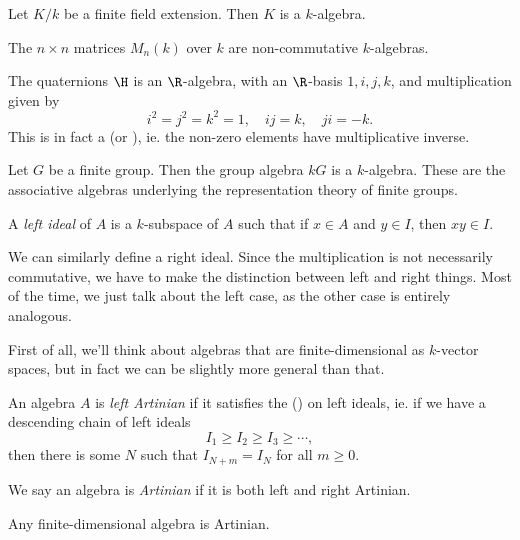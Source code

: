 \documentclass[a4paper]{article}
\begin{document}
\begin{eg}
  Let $K/k$ be a finite field extension. Then $K$ is a $k$-algebra.
\end{eg}

\begin{eg}
  The $n\times n$ matrices $M_n(k)$ over $k$ are non-commutative $k$-algebras.
\end{eg}

\begin{eg}
  The quaternions $\H$ is an $\R$-algebra, with an $\R$-basis $1, i, j, k$, and multiplication given by
  \[
    i^2 = j^2 = k^2 = 1,\quad ij = k,\quad ji = -k.
  \]
  This is in fact a  (or ), ie. the non-zero elements have multiplicative inverse.
\end{eg}

\begin{eg}
  Let $G$ be a finite group. Then the group algebra $kG$ is a $k$-algebra. These are the associative algebras underlying the representation theory of finite groups.
\end{eg}

\begin{defi}[Ideal]
  A \emph{left ideal} of $A$ is a $k$-subspace of $A$ such that if $x \in A$ and $y \in I$, then $xy \in I$.
\end{defi}
We can similarly define a right ideal. Since the multiplication is not necessarily commutative, we have to make the distinction between left and right things. Most of the time, we just talk about the left case, as the other case is entirely analogous.

First of all, we'll think about algebras that are finite-dimensional as $k$-vector spaces, but in fact we can be slightly more general than that.
\begin{defi}
  An algebra $A$ is \emph{left Artinian} if it satisfies the  () on left ideals, ie. if we have a descending chain of left ideals
  \[
    I_1 \geq I_2 \geq I_3 \geq \cdots,
  \]
  then there is some $N$ such that $I_{N + m} = I_{N}$ for all $m \geq 0$.

  We say an algebra is \emph{Artinian} if it is both left and right Artinian.
\end{defi}

\begin{eg}
  Any finite-dimensional algebra is Artinian.
\end{eg}
\end{document}
